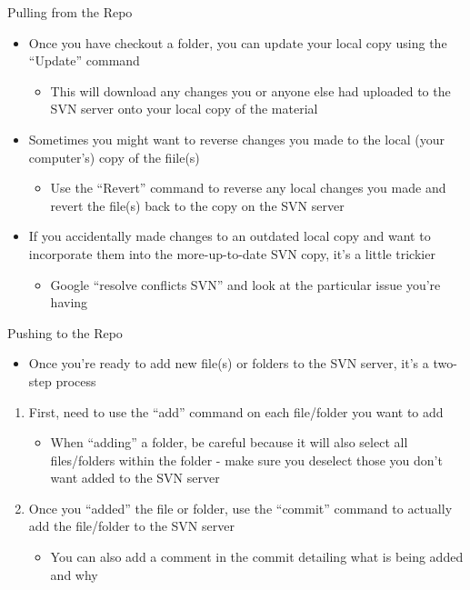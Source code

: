 \documentclass[11pt,mathserif]{beamer} %
\begin{document}
\begin{frame}[t]{Pulling from the Repo}
	\begin{itemize} 
		\item Once you have checkout a folder, you can update your local copy using the ``Update'' command
		\begin{itemize}
			\item This will download any changes you or anyone else had uploaded to the SVN server onto your local copy of the material
		\end{itemize}
\vspace{0.2in}
		\item Sometimes you might want to reverse changes you made to the local (your computer's) copy of the fiile(s)
		\begin{itemize}
			\item Use the ``Revert'' command to reverse any local changes you made and revert the file(s) back to the copy on the SVN server
		\end{itemize}
\vspace{0.2in}
		\item If you accidentally made changes to an outdated local copy and want to incorporate them into the more-up-to-date SVN copy, it's a little trickier
		\begin{itemize}
			\item Google ``resolve conflicts SVN'' and look at the particular issue you're having
		\end{itemize}
	\end{itemize}
\end{frame}


\begin{frame}[t]{Pushing to the Repo}
	\begin{itemize} 
		\item Once you're ready to add new file(s) or folders to the SVN server, it's a two-step process
	\end{itemize}
	\begin{enumerate}
		\item First, need to use the ``add'' command on each file/folder you want to add
		\begin{itemize}
			\item When ``adding'' a folder, be careful because it will also select all files/folders within the folder - make sure you deselect those you don't want added to the SVN server
		\end{itemize}
\vspace{0.1in}
		\item Once you ``added'' the file or folder, use the ``commit'' command to actually add the file/folder to the SVN server
		\begin{itemize}
			\item You can also add a comment in the commit detailing what is being added and why
		\end{itemize}
	\end{enumerate}
\end{frame}
\end{document}

